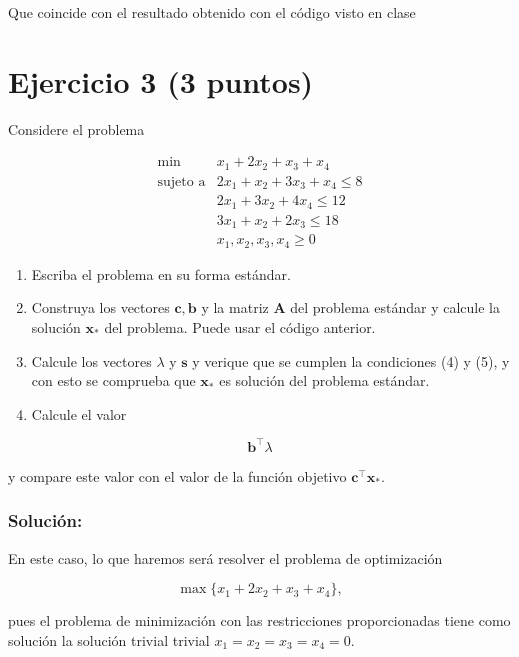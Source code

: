 \documentclass[11pt]{article}
\providecommand{\tightlist}{%
      \setlength{\itemsep}{0pt}\setlength{\parskip}{0pt}}
\begin{document}
    Que coincide con el resultado obtenido con el código visto en clase

    \hypertarget{ejercicio-3-3-puntos}{%
\section{Ejercicio 3 (3 puntos)}\label{ejercicio-3-3-puntos}}

Considere el problema

\[
\begin{array}{rl}
\min & x_1 + 2x_2 + x_3 + x_4\\
\text{sujeto a}  & 2x_1 +  x_2 + 3 x_3 +  x_4 \leq 8  \\
                 & 2x_1 + 3x_2 +         4x_4 \leq 12 \\
                 & 3x_1 +  x_2 + 2 x_3        \leq 18 \\
                 & x_1, x_2, x_3, x_4 \geq 0
\end{array}
\]

\begin{enumerate}
\def\labelenumi{\arabic{enumi}.}
\tightlist
\item
  Escriba el problema en su forma estándar.
\item
  Construya los vectores \(\mathbf{c}, \mathbf{b}\) y la matriz
  \(\mathbf{A}\) del problema estándar y calcule la solución
  \(\mathbf{x}_*\) del problema. Puede usar el código anterior.
\item
  Calcule los vectores \(\lambda\) y \(\mathbf{s}\) y verique
  que se cumplen la condiciones (4) y (5), y con esto se comprueba que
  \(\mathbf{x}_*\) es solución del problema estándar.
\item
  Calcule el valor
\end{enumerate}

\[\mathbf{b}^\top \lambda \]

y compare este valor con el valor de la función objetivo
\(\mathbf{c}^\top \mathbf{x}_*\).

\hypertarget{soluciuxf3n}{%
\subsubsection{Solución:}\label{soluciuxf3n}}

En este caso, lo que haremos será resolver el problema de optimización

\[\max\{x_1+2x_2+x_3+x_4\},\]

pues el problema de minimización con las restricciones proporcionadas
tiene como solución la solución trivial trivial \(x_1=x_2=x_3=x_4=0\).
\end{document}
